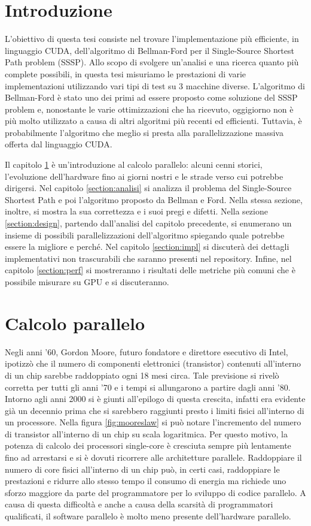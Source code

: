 \documentclass[12pt,a4paper]{book}
\begin{document}
	\chapter*{Introduzione}
	L'obiettivo di questa tesi consiste nel trovare l'implementazione più efficiente, in linguaggio CUDA, dell'algoritmo di Bellman-Ford per il Single-Source Shortest Path problem (SSSP). Allo scopo di svolgere un'analisi e una ricerca quanto più complete possibili, in questa tesi misuriamo le prestazioni di varie implementazioni utilizzando vari tipi di test su 3 macchine diverse. L'algoritmo di Bellman-Ford è stato uno dei primi ad essere proposto come soluzione del SSSP problem e, nonostante le varie ottimizzazioni che ha ricevuto, oggigiorno non è più molto utilizzato a causa di altri algoritmi più recenti ed efficienti. Tuttavia, è probabilmente l'algoritmo che meglio si presta alla parallelizzazione massiva offerta dal linguaggio CUDA.
	
	Il capitolo \ref{section:storia} è un'introduzione al calcolo parallelo: alcuni cenni storici, l'evoluzione dell'hardware fino ai giorni nostri e le strade verso cui potrebbe dirigersi. Nel capitolo \ref{section:analisi} si analizza il problema del Single-Source Shortest Path e poi l'algoritmo proposto da Bellman e Ford. Nella stessa sezione, inoltre, si mostra la sua correttezza e i suoi pregi e difetti. Nella sezione \ref{section:design}, partendo dall'analisi del capitolo precedente, si enumerano un insieme di possibili parallelizzazioni dell'algoritmo spiegando quale potrebbe essere la migliore e perché. Nel capitolo \ref{section:impl} si discuterà dei dettagli implementativi non trascurabili che saranno presenti nel repository. Infine, nel capitolo \ref{section:perf} si mostreranno i risultati delle metriche più comuni che è possibile misurare su GPU e si discuteranno.
	
	\chapter{Calcolo parallelo}
	\label{section:storia}
	Negli anni '60, Gordon Moore, futuro fondatore e direttore esecutivo di Intel, ipotizzò che il numero di componenti elettronici (transistor) contenuti all'interno di un chip sarebbe raddoppiato ogni 18 mesi circa. Tale previsione si rivelò corretta per tutti gli anni '70 e i tempi si allungarono a partire dagli anni '80. Intorno agli anni 2000 si è giunti all'epilogo di questa crescita, infatti era evidente già un decennio prima che si sarebbero raggiunti presto i limiti fisici all'interno di un processore. Nella figura \ref{fig:mooreslaw} si può notare l'incremento del numero di transistor all'interno di un chip su scala logaritmica. Per questo motivo, la potenza di calcolo dei processori single-core è cresciuta sempre più lentamente fino ad arrestarsi e si è dovuti ricorrere alle architetture parallele. Raddoppiare il numero di core fisici all'interno di un chip può, in certi casi, raddoppiare le prestazioni e ridurre allo stesso tempo il consumo di energia ma richiede uno sforzo maggiore da parte del programmatore per lo sviluppo di codice parallelo. A causa di questa difficoltà e anche a causa della scarsità di programmatori qualificati, il software parallelo è molto meno presente dell'hardware parallelo.
	
\end{document}
